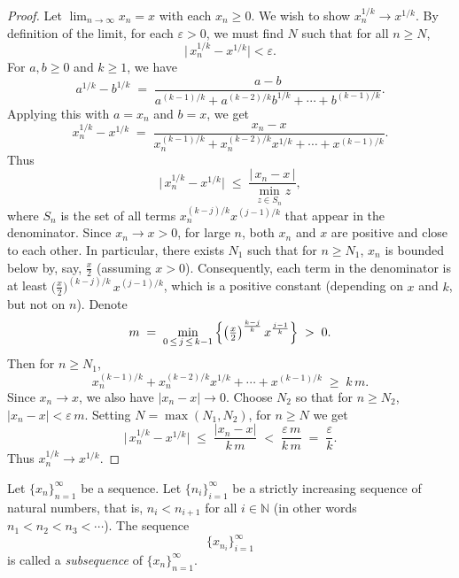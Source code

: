 \documentclass[../main.tex]{subfiles}
\begin{document}
    \begin{proof}
        Let \(\lim_{n\to\infty} x_n = x\) with each \(x_n \ge 0\). We wish to show \(x_n^{1/k} \to x^{1/k}\). By definition of the limit, for each \(\varepsilon > 0\), we must find \(N\) such that for all \(n \ge N\),
\[
\bigl|\,x_n^{1/k} - x^{1/k}\bigr| < \varepsilon.
\]
For \(a,b \ge 0\) and \(k\ge 1\), we have
   \[
     a^{1/k} - b^{1/k}
     \;=\;
     \frac{a - b}{a^{(k-1)/k} + a^{(k-2)/k}b^{1/k} + \cdots + b^{(k-1)/k}}.
   \]
   Applying this with \(a = x_n\) and \(b = x\), we get
   \[
     x_n^{1/k} - x^{1/k}
     \;=\;
     \frac{x_n - x}{x_n^{(k-1)/k} + x_n^{(k-2)/k}x^{1/k} + \cdots + x^{(k-1)/k}}.
   \]
   Thus
   \[
     \bigl|\,x_n^{1/k} - x^{1/k}\bigr|
     \;\le\;
     \frac{|\,x_n - x\,|}{\min\limits_{z \in S_n} z},
   \]
   where \(S_n\) is the set of all terms \(x_n^{(k-j)/k} x^{(j-1)/k}\) that appear in the denominator. 
   Since \(x_n \to x > 0\), for large \(n\), both \(x_n\) and \(x\) are positive and close to each other. In particular, there exists \(N_1\) such that for \(n \ge N_1\), \(x_n\) is bounded below by, say, \(\tfrac{x}{2}\) (assuming \(x>0\)). Consequently, each term in the denominator is at least \(\bigl(\tfrac{x}{2}\bigr)^{(k-j)/k}\,x^{(j-1)/k}\), which is a positive constant (depending on \(x\) and \(k\), but not on \(n\)). Denote
   \[
     m \;=\;
     \min_{0 \,\le\, j \,\le\, k-1}\,\Bigl\{\bigl(\tfrac{x}{2}\bigr)^{\frac{k-j}{k}}\,x^{\frac{j-1}{k}}\Bigr\}
     \;>\;
     0.
   \]
   Then for \(n \ge N_1\),
   \[
     x_n^{(k-1)/k} + x_n^{(k-2)/k}x^{1/k} + \cdots + x^{(k-1)/k}
     \;\ge\;
     k\,m.
   \]
   Since \(x_n \to x\), we also have \(\bigl|x_n - x\bigr|\to 0\). Choose \(N_2\) so that for \(n \ge N_2\), \(\bigl|x_n - x\bigr| < \varepsilon\,m\). Setting \(N = \max(N_1, N_2)\), for \(n \ge N\) we get
   \[
     \bigl|\,x_n^{1/k} - x^{1/k}\bigr|
     \;\le\;
     \frac{|x_n - x|}{k\,m}
     \;<\;
     \frac{\varepsilon\,m}{k\,m}
     \;=\;
     \frac{\varepsilon}{k}.
   \]
   Thus \(x_n^{1/k} \to x^{1/k}\).


    \end{proof}
    
    
    
    
    
    
    \begin{definition} \label{def:subsequence}
    Let \( \{x_n\}_{n=1}^{\infty} \) be a sequence. Let \( \{n_i\}_{i=1}^{\infty} \) be a strictly increasing sequence of natural numbers, that is, \( n_i < n_{i+1} \) for all \( i \in \mathbb{N} \) (in other words \( n_1 < n_2 < n_3 < \cdots \)). The sequence
    \[
    \{x_{n_i}\}_{i=1}^{\infty}
    \]
    is called a \textit{subsequence} of \( \{x_n\}_{n=1}^{\infty} \).
    \end{definition}
    
\end{document}
